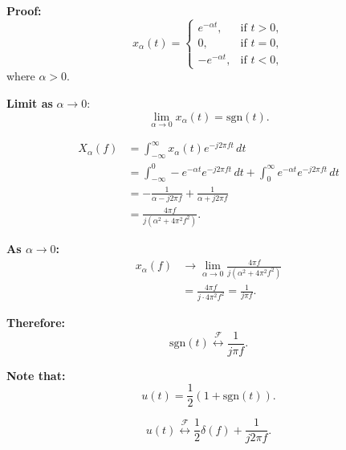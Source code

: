 \begin{derivation}
    \textbf{Proof:}
\[
x_\alpha(t) =
\begin{cases}
    e^{-\alpha t}, & \text{if } t > 0, \\
    0, & \text{if } t = 0, \\
    -e^{-\alpha t}, & \text{if } t < 0,
\end{cases}
\]
where \( \alpha > 0 \).

\bigskip

\textbf{Limit as } \( \alpha \to 0 \):
\[
\lim_{\alpha \to 0} x_\alpha(t) = \text{sgn}(t).
\]



\begin{align*}
    X_\alpha(f) &= \int_{-\infty}^{\infty} x_\alpha(t) e^{-j 2 \pi f t} \, dt \\
    &= \int_{-\infty}^{0} -e^{-\alpha t} e^{-j 2 \pi f t} \, dt + \int_{0}^{\infty} e^{-\alpha t} e^{-j 2 \pi f t} \, dt \\
    &= -\frac{1}{\alpha - j 2 \pi f} + \frac{1}{\alpha + j 2 \pi f} \\
    &= \frac{4 \pi f}{j (\alpha^2 + 4 \pi^2 f^2)}.
\end{align*}

\textbf{As \( \alpha \to 0 \):}
\begin{align*}
    x_\alpha(f) &\to \lim_{\alpha \to 0} \frac{4 \pi f}{j (\alpha^2 + 4 \pi^2 f^2)} \\
    &= \frac{4 \pi f}{j \cdot 4 \pi^2 f^2} = \frac{1}{j \pi f}.
\end{align*}

\textbf{Therefore:}
\[
\text{sgn}(t) \overset{\mathcal{F}}{\leftrightarrow} \frac{1}{j \pi f}.
\]

\bigskip

\textbf{Note that:}
\[
u(t) = \frac{1}{2} \left(1 + \text{sgn}(t)\right).
\]

\[
u(t) \overset{\mathcal{F}}{\leftrightarrow} \frac{1}{2} \delta(f) + \frac{1}{j 2 \pi f}.
\]
\end{derivation}
